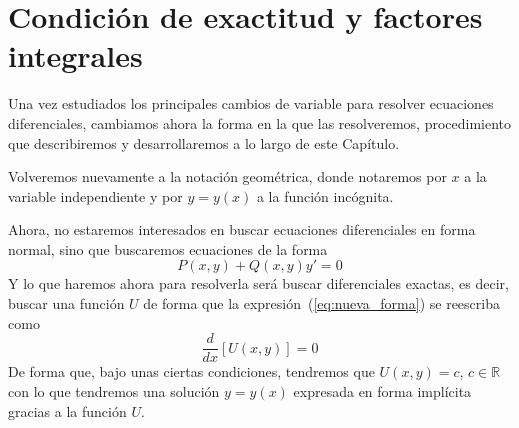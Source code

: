 \newpage
\chapter{Condición de exactitud y factores integrales}
Una vez estudiados los principales cambios de variable para resolver ecuaciones diferenciales, cambiamos ahora la forma en la que las resolveremos, procedimiento que describiremos y desarrollaremos a lo largo de este Capítulo.

\begin{notacion}
    Volveremos nuevamente a la notación geométrica, donde notaremos por $x$ a la variable independiente y por $y = y(x)$ a la función incógnita.
\end{notacion}

Ahora, no estaremos interesados en buscar ecuaciones diferenciales en forma normal, sino que buscaremos ecuaciones de la forma
\begin{equation}\label{eq:nueva_forma}
    P(x,y) + Q(x,y)y' = 0
\end{equation}
Y lo que haremos ahora para resolverla será buscar diferenciales exactas, es decir, buscar una función $U$ de forma que la expresión~(\ref{eq:nueva_forma}) se reescriba como
\begin{equation*}
    \dfrac{d}{dx}[U(x,y)] = 0
\end{equation*}
De forma que, bajo unas ciertas condiciones, tendremos que $U(x,y)= c$, $c\in \mathbb{R}$ con lo que tendremos una solución $y=y(x)$ expresada en forma implícita gracias a la función $U$.

